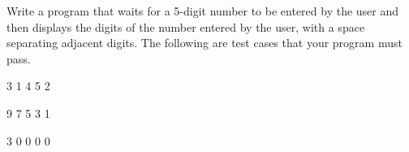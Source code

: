 Write a program that waits for a 5-digit number to be entered by the user 
and then displays the digits of the number entered by the user, 
with a space separating adjacent digits. 
The following are test cases that your program must pass.

\resett
\nextt
\begin{console}[commandchars=\\\{\}]
3 1 4 5 2
\end{console}

\nextt
\begin{console}[commandchars=\\\{\}]
9 7 5 3 1
\end{console}

\nextt
\begin{console}[commandchars=\\\{\}]
3 0 0 0 0
\end{console}
